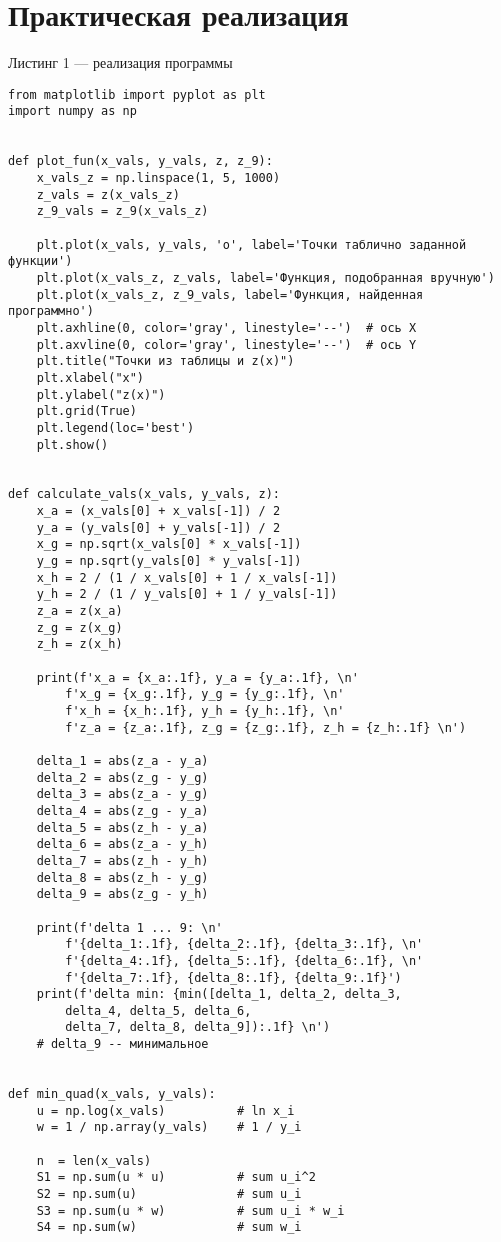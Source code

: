 \documentclass[a4paper, 14pt]{extarticle}
\begin{document}
\section{Практическая реализация}
Листинг 1 — реализация программы
\begin{verbatim}
from matplotlib import pyplot as plt
import numpy as np


def plot_fun(x_vals, y_vals, z, z_9):
	x_vals_z = np.linspace(1, 5, 1000)
	z_vals = z(x_vals_z)
	z_9_vals = z_9(x_vals_z)
	
	plt.plot(x_vals, y_vals, 'o', label='Точки таблично заданной функции')
	plt.plot(x_vals_z, z_vals, label='Функция, подобранная вручную')
	plt.plot(x_vals_z, z_9_vals, label='Функция, найденная программно')
	plt.axhline(0, color='gray', linestyle='--')  # ось X
	plt.axvline(0, color='gray', linestyle='--')  # ось Y
	plt.title("Точки из таблицы и z(x)")
	plt.xlabel("x")
	plt.ylabel("z(x)")
	plt.grid(True)
	plt.legend(loc='best')
	plt.show()


def calculate_vals(x_vals, y_vals, z):
	x_a = (x_vals[0] + x_vals[-1]) / 2
	y_a = (y_vals[0] + y_vals[-1]) / 2
	x_g = np.sqrt(x_vals[0] * x_vals[-1])
	y_g = np.sqrt(y_vals[0] * y_vals[-1])
	x_h = 2 / (1 / x_vals[0] + 1 / x_vals[-1])
	y_h = 2 / (1 / y_vals[0] + 1 / y_vals[-1])
	z_a = z(x_a)
	z_g = z(x_g)
	z_h = z(x_h)
	
	print(f'x_a = {x_a:.1f}, y_a = {y_a:.1f}, \n'
		f'x_g = {x_g:.1f}, y_g = {y_g:.1f}, \n'
		f'x_h = {x_h:.1f}, y_h = {y_h:.1f}, \n'
		f'z_a = {z_a:.1f}, z_g = {z_g:.1f}, z_h = {z_h:.1f} \n')
	
	delta_1 = abs(z_a - y_a)
	delta_2 = abs(z_g - y_g)
	delta_3 = abs(z_a - y_g)
	delta_4 = abs(z_g - y_a)
	delta_5 = abs(z_h - y_a)
	delta_6 = abs(z_a - y_h)
	delta_7 = abs(z_h - y_h)
	delta_8 = abs(z_h - y_g)
	delta_9 = abs(z_g - y_h)
	
	print(f'delta 1 ... 9: \n'
		f'{delta_1:.1f}, {delta_2:.1f}, {delta_3:.1f}, \n'
		f'{delta_4:.1f}, {delta_5:.1f}, {delta_6:.1f}, \n'
		f'{delta_7:.1f}, {delta_8:.1f}, {delta_9:.1f}')
	print(f'delta min: {min([delta_1, delta_2, delta_3,
		delta_4, delta_5, delta_6,
		delta_7, delta_8, delta_9]):.1f} \n')
	# delta_9 -- минимальное


def min_quad(x_vals, y_vals):
	u = np.log(x_vals)          # ln x_i
	w = 1 / np.array(y_vals)    # 1 / y_i
	
	n  = len(x_vals)
	S1 = np.sum(u * u)          # sum u_i^2
	S2 = np.sum(u)              # sum u_i
	S3 = np.sum(u * w)          # sum u_i * w_i
	S4 = np.sum(w)              # sum w_i
	

\end{verbatim}
\end{document}
